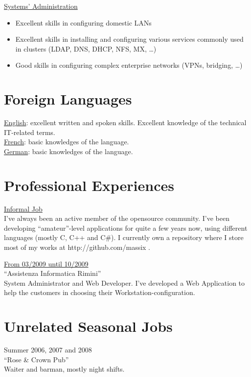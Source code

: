 \documentclass[margin]{res}
\begin{document}
\begin{resume}
	\underline{Systems' Administration}
		\begin{itemize}
			\item Excellent skills in configuring domestic LANs
			\item Excellent skills in installing and configuring various services commonly used
			in clusters (LDAP, DNS, DHCP, NFS, MX, \ldots)
			\item Good skills in configuring complex enterprise networks (VPNs, bridging, \ldots)
		\end{itemize}

\section{Foreign Languages} 
\underline{English}: excellent written and spoken skills. Excellent knowledge of the technical 
IT-related terms. \\
\underline{French}: basic knowledges of the language. \\
\underline{German}: basic knowledges of the language. \\
 

\section{Professional Experiences}
\underline{Informal Job} \\
I've always been an active member of the opensource community. I've been developing ``amateur''-level
applications for quite a few years now, using different languages (mostly C, C++ and C\#). I currently
own a repository where I store most of my works at http://github.com/massix .

\vspace{2mm}

\underline{From 03/2009 until 10/2009} \\
``Assistenza Informatica Rimini'' \\
System Administrator and Web Developer. I've developed a Web Application to help the customers
in choosing their Workstation-configuration.

\section{Unrelated Seasonal Jobs}
Summer 2006, 2007 and 2008 \\
``Rose \& Crown Pub'' \\
Waiter and barman, mostly night shifts.


\end{resume}
\end{document}
